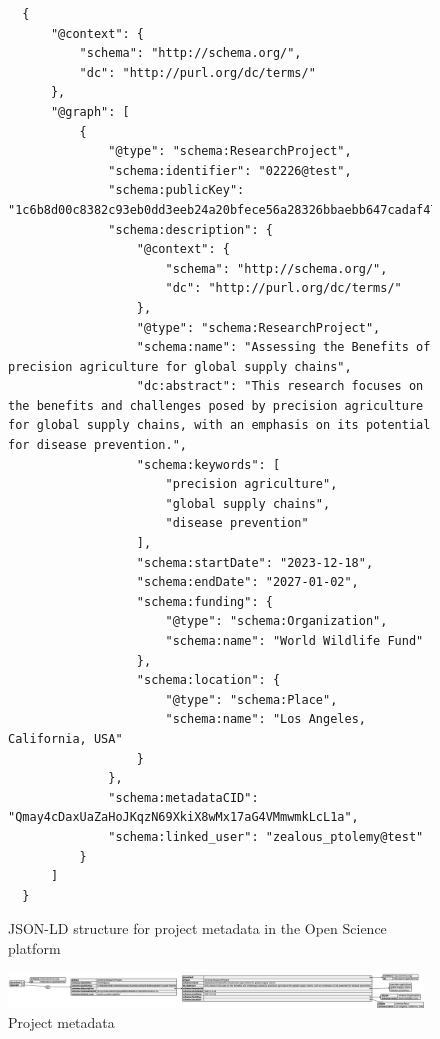 \documentclass{article}
\begin{document}
\begin{figure}[h]
      \centering
      \caption{JSON-LD structure for project metadata in the Open Science platform}
      \label{jsonld:project}
      \begin{verbatim}
  {
      "@context": {
          "schema": "http://schema.org/",
          "dc": "http://purl.org/dc/terms/"
      },
      "@graph": [
          {
              "@type": "schema:ResearchProject",
              "schema:identifier": "02226@test",
              "schema:publicKey": "1c6b8d00c8382c93eb0dd3eeb24a20bfece56a28326bbaebb647cadaf4750520",
              "schema:description": {
                  "@context": {
                      "schema": "http://schema.org/",
                      "dc": "http://purl.org/dc/terms/"
                  },
                  "@type": "schema:ResearchProject",
                  "schema:name": "Assessing the Benefits of precision agriculture for global supply chains",
                  "dc:abstract": "This research focuses on the benefits and challenges posed by precision agriculture for global supply chains, with an emphasis on its potential for disease prevention.",
                  "schema:keywords": [
                      "precision agriculture",
                      "global supply chains",
                      "disease prevention"
                  ],
                  "schema:startDate": "2023-12-18",
                  "schema:endDate": "2027-01-02",
                  "schema:funding": {
                      "@type": "schema:Organization",
                      "schema:name": "World Wildlife Fund"
                  },
                  "schema:location": {
                      "@type": "schema:Place",
                      "schema:name": "Los Angeles, California, USA"
                  }
              },
              "schema:metadataCID": "Qmay4cDaxUaZaHoJKqzN69XkiX8wMx17aG4VMmwmkLcL1a",
              "schema:linked_user": "zealous_ptolemy@test"
          }
      ]
  }
  \end{verbatim}
\end{figure}


\begin{figure}[htbp]
      \centering
      \includegraphics[width=0.98\textwidth, keepaspectratio]{project_metadata.eps}
      \caption{Project metadata}
      \label{fig:project_metadata}
\end{figure}
\end{document}
